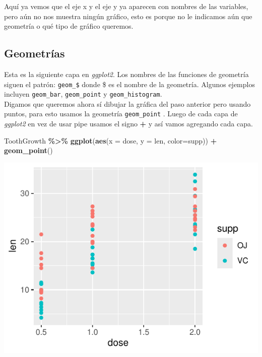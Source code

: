 \documentclass[
]{book}
\newenvironment{Shaded}{\begin{snugshade}}{\end{snugshade}}
\newcommand{\AttributeTok}[1]{\textcolor[rgb]{0.13,0.29,0.53}{#1}}
\newcommand{\FunctionTok}[1]{\textcolor[rgb]{0.13,0.29,0.53}{\textbf{#1}}}
\newcommand{\NormalTok}[1]{#1}
\newcommand{\SpecialCharTok}[1]{\textcolor[rgb]{0.81,0.36,0.00}{\textbf{#1}}}
\begin{document}
Aquí ya vemos que el eje x y el eje y ya aparecen con nombres de las variables, pero aún no nos muestra ningún gráfico, esto es porque no le indicamos aún que geometría o qué tipo de gráfico queremos.

\subsection{Geometrías}\label{geometruxedas}

Esta es la siguiente capa en \emph{ggplot2}.
Los nombres de las funciones de geometría siguen el patrón: \texttt{geom\_\$} donde \$ es el nombre de la geometría.
Algunos ejemplos incluyen \texttt{geom\_bar}, \texttt{geom\_point} y \texttt{geom\_histogram}.\\
Digamos que queremos ahora sí dibujar la gráfica del paso anterior pero usando puntos, para esto usamos la geometría \texttt{geom\_point} .
Luego de cada capa de \emph{ggplot2} en vez de usar pipe usamos el signo \textbf{+} y así vamos agregando cada capa.\\

\begin{Shaded}
\begin{Highlighting}[]
\NormalTok{ToothGrowth }\SpecialCharTok{\%\textgreater{}\%} \FunctionTok{ggplot}\NormalTok{(}\FunctionTok{aes}\NormalTok{(}\AttributeTok{x =}\NormalTok{ dose, }\AttributeTok{y =}\NormalTok{ len, }\AttributeTok{color=}\NormalTok{supp)) }\SpecialCharTok{+}
  \FunctionTok{geom\_point}\NormalTok{()}
\end{Highlighting}
\end{Shaded}

\begin{center}\includegraphics{R_Manual_files/figure-latex/unnamed-chunk-206-1} \end{center}
\end{document}
